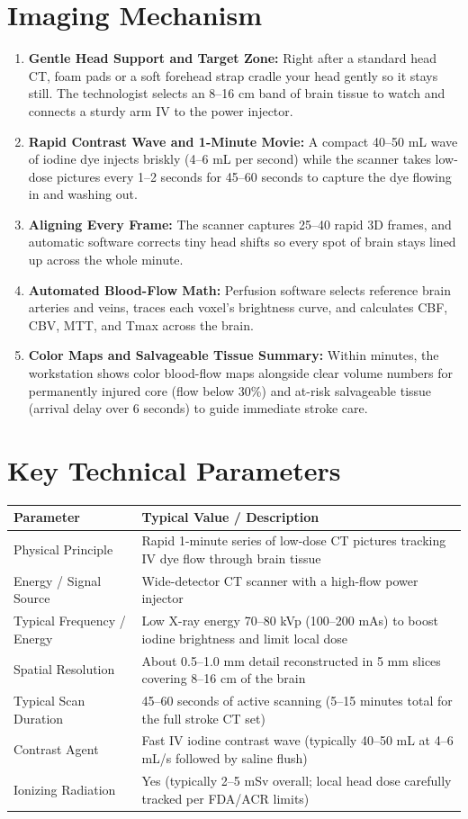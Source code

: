 \section{Imaging Mechanism}
\begin{enumerate}
    \item \textbf{Gentle Head Support and Target Zone:} Right after a standard head CT, foam pads or a soft forehead strap cradle your head gently so it stays still. The technologist selects an 8--16 cm band of brain tissue to watch and connects a sturdy arm IV to the power injector.
    \item \textbf{Rapid Contrast Wave and 1-Minute Movie:} A compact 40--50 mL wave of iodine dye injects briskly (4--6 mL per second) while the scanner takes low-dose pictures every 1--2 seconds for 45--60 seconds to capture the dye flowing in and washing out.
    \item \textbf{Aligning Every Frame:} The scanner captures 25--40 rapid 3D frames, and automatic software corrects tiny head shifts so every spot of brain stays lined up across the whole minute.
    \item \textbf{Automated Blood-Flow Math:} Perfusion software selects reference brain arteries and veins, traces each voxel's brightness curve, and calculates CBF, CBV, MTT, and Tmax across the brain.
    \item \textbf{Color Maps and Salvageable Tissue Summary:} Within minutes, the workstation shows color blood-flow maps alongside clear volume numbers for permanently injured core (flow below 30\%) and at-risk salvageable tissue (arrival delay over 6 seconds) to guide immediate stroke care.
\end{enumerate}

\section{Key Technical Parameters}
\noindent
\begin{tabularx}{\textwidth}{@{}l X@{}}
\toprule
\textbf{Parameter} & \textbf{Typical Value / Description} \\
\midrule
Physical Principle & Rapid 1-minute series of low-dose CT pictures tracking IV dye flow through brain tissue \\
Energy / Signal Source & Wide-detector CT scanner with a high-flow power injector \\
Typical Frequency / Energy & Low X-ray energy 70--80 kVp (100--200 mAs) to boost iodine brightness and limit local dose \\
Spatial Resolution & About 0.5--1.0 mm detail reconstructed in 5 mm slices covering 8--16 cm of the brain \\
Typical Scan Duration & 45--60 seconds of active scanning (5--15 minutes total for the full stroke CT set) \\
Contrast Agent & Fast IV iodine contrast wave (typically 40--50 mL at 4--6 mL/s followed by saline flush) \\
Ionizing Radiation & Yes (typically 2--5 mSv overall; local head dose carefully tracked per FDA/ACR limits) \\
\bottomrule
\end{tabularx}

